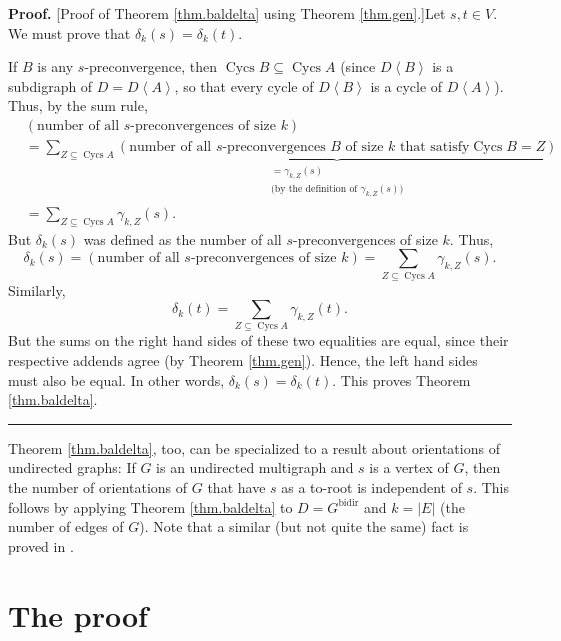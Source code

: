 \documentclass[numbers=enddot,12pt,final,onecolumn,notitlepage]{scrartcl}%
\theoremstyle{definition}
\newenvironment{proof}[1][Proof]{\noindent\textbf{#1.} }{\ \rule{0.5em}{0.5em}}
\let\sumnonlimits\sum
\renewcommand{\sum}{\sumnonlimits\limits}
\theoremstyle{plainsl}
\begin{document}
\begin{proof}
[Proof of Theorem \ref{thm.baldelta} using Theorem \ref{thm.gen}.]Let $s,t\in
V$. We must prove that $\delta_{k}\left(  s\right)  =\delta_{k}\left(
t\right)  $.

If $B$ is any $s$-preconvergence, then $\operatorname*{Cycs}B\subseteq
\operatorname*{Cycs}A$ (since $D\left\langle B\right\rangle $ is a subdigraph
of $D=D\left\langle A\right\rangle $, so that every cycle of $D\left\langle
B\right\rangle $ is a cycle of $D\left\langle A\right\rangle $). Thus, by the
sum rule,%
\begin{align*}
&  \left(  \text{number of all }s\text{-preconvergences of size }k\right)  \\
&  =\sum_{Z\subseteq\operatorname*{Cycs}A}\underbrace{\left(  \text{number of
all }s\text{-preconvergences }B\text{ of size }k\text{ that satisfy
}\operatorname*{Cycs}B=Z\right)  }_{\substack{=\gamma_{k,Z}\left(  s\right)
\\\text{(by the definition of }\gamma_{k,Z}\left(  s\right)  \text{)}}}\\
&  =\sum_{Z\subseteq\operatorname*{Cycs}A}\gamma_{k,Z}\left(  s\right)  .
\end{align*}
But $\delta_{k}\left(  s\right)  $ was defined as the number of all
$s$-preconvergences of size $k$. Thus,%
\[
\delta_{k}\left(  s\right)  =\left(  \text{number of all }%
s\text{-preconvergences of size }k\right)  =\sum_{Z\subseteq
\operatorname*{Cycs}A}\gamma_{k,Z}\left(  s\right)  .
\]
Similarly,%
\[
\delta_{k}\left(  t\right)  =\sum_{Z\subseteq\operatorname*{Cycs}A}%
\gamma_{k,Z}\left(  t\right)  .
\]
But the sums on the right hand sides of these two equalities are equal, since
their respective addends agree (by Theorem \ref{thm.gen}). Hence, the left
hand sides must also be equal. In other words, $\delta_{k}\left(  s\right)
=\delta_{k}\left(  t\right)  $. This proves Theorem \ref{thm.baldelta}.
\end{proof}

Theorem \ref{thm.baldelta}, too, can be specialized to a result about
orientations of undirected graphs: If $G$ is an undirected multigraph and $s$
is a vertex of $G$, then the number of orientations of $G$ that have $s$ as a
to-root is independent of $s$. This follows by applying Theorem
\ref{thm.baldelta} to $D=G^{\operatorname*{bidir}}$ and $k=\left\vert
E\right\vert $ (the number of edges of $G$). Note that a similar (but not
quite the same) fact is proved in \cite[Theorem 3.4]{Gioan07}.

\section{The proof}
\end{document}
